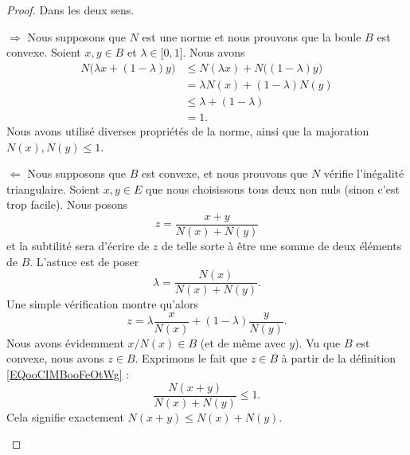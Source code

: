 \begin{proof}
    Dans les deux sens.
    \begin{subproof}
    \item[\( \Rightarrow\)]
        Nous supposons que \( N\) est une norme et nous prouvons que la boule \( B\) est convexe. Soient \( x,y\in B\) et \( \lambda\in \mathopen[ 0 , 1 \mathclose]\). Nous avons
        \begin{subequations}
            \begin{align}
                N\big( \lambda x+(1-\lambda)y \big)&\leq N(\lambda x)+N\big( (1-\lambda)y \big)\\
                &=\lambda N(x)+(1-\lambda)N(y)\\
                &\leq \lambda +(1-\lambda)\\
                &=1.
            \end{align}
        \end{subequations}
        Nous avons utilisé diverses propriétés de la norme, ainsi que la majoration \( N(x), N(y)\leq 1\).
    \item[\( \Leftarrow\)]
        Nous supposons que \( B\) est convexe, et nous prouvons que \( N\) vérifie l'inégalité triangulaire. Soient \( x,y\in E\) que nous choisissons tous deux non nuls (sinon c'est trop facile). Nous posons
        \begin{equation}        \label{EQooCIMBooFeOtWg}
            z=\frac{ x+y }{ N(x)+N(y) }
        \end{equation}
        et la subtilité sera d'écrire de \( z\) de telle sorte à être une somme de deux éléments de \( B\). L'astuce est de poser
        \begin{equation}
            \lambda=\frac{ N(x) }{ N(x)+N(y) }.
        \end{equation}
        Une simple vérification montre qu'alors
        \begin{equation}
            z = \lambda\frac{ x }{ N(x) }+  (1-\lambda) \frac{ y }{ N(y) }.
        \end{equation}
        Nous avons évidemment \( x/N(x)\in B\) (et de même avec \( y\)). Vu que \( B\) est convexe, nous avons \( z\in B\). Exprimons le fait que \( z\in B\) à partir de la définition \eqref{EQooCIMBooFeOtWg} :
        \begin{equation}
            \frac{ N(x+y) }{ N(x)+N(y) }\leq 1.
        \end{equation}
        Cela signifie exactement \( N(x+y)\leq N(x)+N(y)\).
    \end{subproof}
\end{proof}


